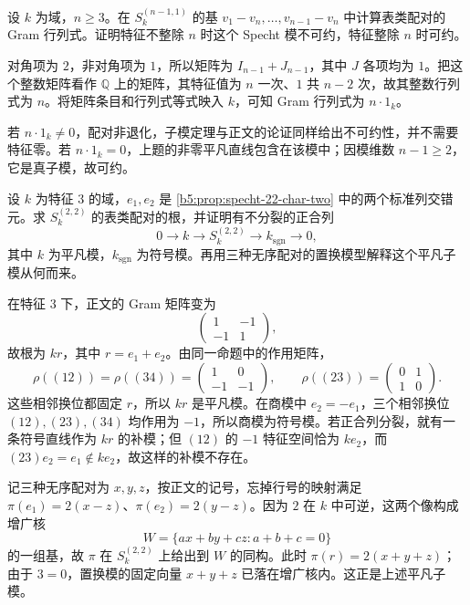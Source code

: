 \begin{exercise}\label{b5:ex:06-hook-gram}
	设 \(k\) 为域，\(n\geq3\)。在 \(S_k^{(n-1,1)}\) 的基 \(v_1-v_n,\ldots,v_{n-1}-v_n\) 中计算表类配对的 Gram 行列式。证明特征不整除 \(n\) 时这个 Specht 模不可约，特征整除 \(n\) 时可约。
\end{exercise}
\begin{solution}
	对角项为 \(2\)，非对角项为 \(1\)，所以矩阵为 \(I_{n-1}+J_{n-1}\)，其中 \(J\) 各项均为 \(1\)。把这个整数矩阵看作 \(\mathbb Q\) 上的矩阵，其特征值为 \(n\) 一次、\(1\) 共 \(n-2\) 次，故其整数行列式为 \(n\)。将矩阵条目和行列式等式映入 \(k\)，可知 Gram 行列式为 \(n\cdot1_k\)。

	若 \(n\cdot1_k\ne0\)，配对非退化，子模定理与正文的论证同样给出不可约性，并不需要特征零。若 \(n\cdot1_k=0\)，上题的非零平凡直线包含在该模中；因模维数 \(n-1\geq2\)，它是真子模，故可约。
\end{solution}

\begin{exercise}\label{b5:ex:06-gram-22}
	设 \(k\) 为特征 \(3\) 的域，\(e_1,e_2\) 是 \cref{b5:prop:specht-22-char-two} 中的两个标准列交错元。求 \(S_k^{(2,2)}\) 的表类配对的根，并证明有不分裂的正合列
	\[
		0\longrightarrow k\longrightarrow S_k^{(2,2)} \longrightarrow k_{\mathrm{sgn}}\longrightarrow0,
	\]
	其中 \(k\) 为平凡模，\(k_{\mathrm{sgn}}\) 为符号模。再用三种无序配对的置换模型解释这个平凡子模从何而来。
\end{exercise}
\begin{solution}
	在特征 \(3\) 下，正文的 Gram 矩阵变为
	\[
		\begin{pmatrix}1&-1\\-1&1\end{pmatrix},
	\]
	故根为 \(kr\)，其中 \(r=e_1+e_2\)。由同一命题中的作用矩阵，
	\[
		\rho((12))=\rho((34))=
		\begin{pmatrix}1&0\\-1&-1\end{pmatrix},
		\qquad
		\rho((23))=\begin{pmatrix}0&1\\1&0\end{pmatrix}.
	\]
	这些相邻换位都固定 \(r\)，所以 \(kr\) 是平凡模。在商模中 \(e_2=-e_1\)，三个相邻换位 \((12),(23),(34)\) 均作用为 \(-1\)，所以商模为符号模。若正合列分裂，就有一条符号直线作为 \(kr\) 的补模；但 \((12)\) 的 \(-1\) 特征空间恰为 \(ke_2\)，而 \((23)e_2=e_1\notin ke_2\)，故这样的补模不存在。

	记三种无序配对为 \(x,y,z\)，按正文的记号，忘掉行号的映射满足 \(\pi(e_1)=2(x-z)\)、\(\pi(e_2)=2(y-z)\)。因为 \(2\) 在 \(k\) 中可逆，这两个像构成增广核
	\[
		W=\{ax+by+cz:a+b+c=0\}
	\]
	的一组基，故 \(\pi\) 在 \(S_k^{(2,2)}\) 上给出到 \(W\) 的同构。此时 \(\pi(r)=2(x+y+z)\)；由于 \(3=0\)，置换模的固定向量 \(x+y+z\) 已落在增广核内。这正是上述平凡子模。
\end{solution}

